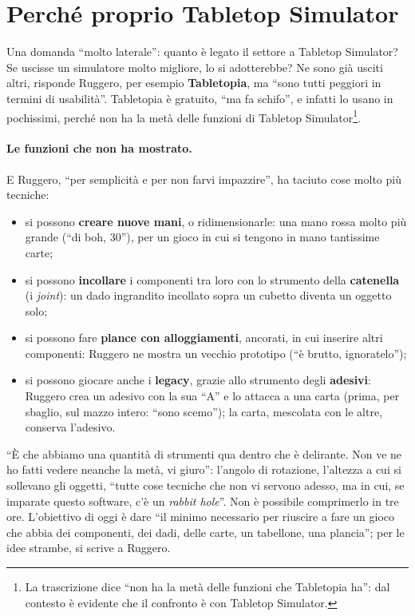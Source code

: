\section{Perché proprio Tabletop Simulator}
\label{a8:sec:alternative}

Una domanda ``molto laterale'': quanto è legato il settore a Tabletop Simulator? Se
uscisse un simulatore molto migliore, lo si adotterebbe? Ne sono già usciti altri,
risponde Ruggero, per esempio \textbf{Tabletopia}, ma ``sono tutti peggiori in termini
di usabilità''. Tabletopia è gratuito, ``ma fa schifo'', e infatti lo usano in
pochissimi, perché non ha la metà delle funzioni di Tabletop Simulator\footnote{La
trascrizione dice ``non ha la metà delle funzioni che Tabletopia ha'': dal contesto è
evidente che il confronto è con Tabletop Simulator.}.

\paragraph{Le funzioni che non ha mostrato.} E Ruggero, ``per semplicità e per non
farvi impazzire'', ha taciuto cose molto più tecniche:
\begin{itemize}
  \item si possono \textbf{creare nuove mani}, o ridimensionarle: una mano rossa
        molto più grande (``di boh, 30''), per un gioco in cui si tengono in mano
        tantissime carte;
  \item si possono \textbf{incollare} i componenti tra loro con lo strumento della
        \textbf{catenella} (i \emph{joint}): un dado ingrandito incollato sopra un
        cubetto diventa un oggetto solo;
  \item si possono fare \textbf{plance con alloggiamenti}, ancorati, in cui inserire
        altri componenti: Ruggero ne mostra un vecchio prototipo (``è brutto,
        ignoratelo'');
  \item si possono giocare anche i \textbf{legacy}, grazie allo strumento degli
        \textbf{adesivi}: Ruggero crea un adesivo con la sua ``A'' e lo attacca a una
        carta (prima, per sbaglio, sul mazzo intero: ``sono scemo''); la carta,
        mescolata con le altre, conserva l'adesivo.
\end{itemize}
``È che abbiamo una quantità di strumenti qua dentro che è delirante. Non ve ne ho fatti
vedere neanche la metà, vi giuro'': l'angolo di rotazione, l'altezza a cui si
sollevano gli oggetti, ``tutte cose tecniche che non vi servono adesso, ma in cui, se
imparate questo software, c'è un \emph{rabbit hole}''. Non è possibile comprimerlo in
tre ore. L'obiettivo di oggi è dare ``il minimo necessario per riuscire a fare un gioco
che abbia dei componenti, dei dadi, delle carte, un tabellone, una plancia''; per le
idee strambe, si scrive a Ruggero.

